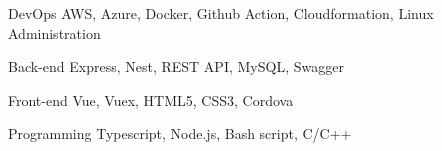 

\begin{cvskills}

  \cvskill
    {DevOps} %
    {AWS, Azure, Docker, Github Action, Cloudformation, Linux Administration} %

  \cvskill
    {Back-end} %
    {Express, Nest, REST API, MySQL, Swagger} %

  \cvskill
    {Front-end} %
    {Vue, Vuex, HTML5, CSS3, Cordova} %

  \cvskill
    {Programming} %
    {Typescript, Node.js, Bash script, C/C++} %

\end{cvskills}
